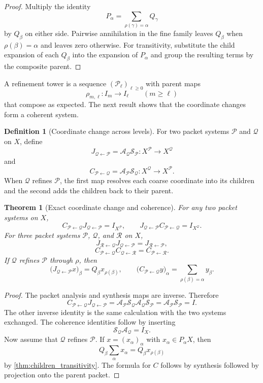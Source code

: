 \documentclass[11pt,a4paper]{article}
\newtheorem{theorem}{Theorem}[section]
\theoremstyle{definition}
\newtheorem{definition}[definition]{Definition}
\theoremstyle{remark}
\newcommand{\Acal}{\mathcal A}
\newcommand{\Pcal}{\mathcal P}
\newcommand{\Qcal}{\mathcal Q}
\newcommand{\Scal}{\mathcal S}
\newcommand{\Rcal}{\mathcal R}
\theoremstyle{definition}\newtheorem{construction}[theorem]{Construction}\newtheorem{certificate}[theorem]{Numerical Certificate}
\theoremstyle{remark}\newtheorem{boundary}[theorem]{Boundary}
\begin{document}
\begin{proof}
Multiply the identity
\[
P_\alpha=\sum_{\rho(\gamma)=\alpha}Q_\gamma
\]
by $Q_\beta$ on either side.  Pairwise annihilation in the fine family leaves $Q_\beta$ when $\rho(\beta)=\alpha$ and leaves zero otherwise.  For transitivity, substitute the child expansion of each $Q_\beta$ into the expansion of $P_\alpha$ and group the resulting terms by the composite parent.
\end{proof}

A refinement tower is a sequence $(\Pcal_\ell)_{\ell\geq0}$ with parent maps
\[
\rho_{m,\ell}:I_m\longrightarrow I_\ell
\qquad(m\geq\ell)
\]
that compose as expected.  The next result shows that the coordinate changes form a coherent system.

\begin{definition}[Coordinate change across levels]\label{def:coordinate_change}\label{def:coordinate-refinement}
For two packet systems $\Pcal$ and $\Qcal$ on $X$, define
\[
J_{\Qcal\leftarrow\Pcal}
=
\Acal_{\Qcal}\Scal_{\Pcal}:X^{\Pcal}\longrightarrow X^{\Qcal}
\]
and
\[
C_{\Pcal\leftarrow\Qcal}
=
\Acal_{\Pcal}\Scal_{\Qcal}:X^{\Qcal}\longrightarrow X^{\Pcal}.
\]
When $\Qcal$ refines $\Pcal$, the first map resolves each coarse coordinate into its children and the second adds the children back to their parent.
\end{definition}

\begin{theorem}[Exact coordinate change and coherence]\label{thm:coordinate_coherence}\label{prop:perfect-reconstruction}
For any two packet systems on $X$,
\[
C_{\Pcal\leftarrow\Qcal}J_{\Qcal\leftarrow\Pcal}=I_{X^{\Pcal}},
\qquad
J_{\Qcal\leftarrow\Pcal}C_{\Pcal\leftarrow\Qcal}=I_{X^{\Qcal}}.
\]
For three packet systems $\Pcal$, $\Qcal$, and $\Rcal$ on $X$,
\[
J_{\Rcal\leftarrow\Qcal}J_{\Qcal\leftarrow\Pcal}
=
J_{\Rcal\leftarrow\Pcal},
\]
\[
C_{\Pcal\leftarrow\Qcal}C_{\Qcal\leftarrow\Rcal}
=
C_{\Pcal\leftarrow\Rcal}.
\]
If $\Qcal$ refines $\Pcal$ through $\rho$, then
\[
\bigl(J_{\Qcal\leftarrow\Pcal}x\bigr)_\beta
=
Q_\beta x_{\rho(\beta)},
\qquad
\bigl(C_{\Pcal\leftarrow\Qcal}y\bigr)_\alpha
=
\sum_{\rho(\beta)=\alpha}y_\beta.
\]
\end{theorem}

\begin{proof}
The packet analysis and synthesis maps are inverse.  Therefore
\[
C_{\Pcal\leftarrow\Qcal}J_{\Qcal\leftarrow\Pcal}
=
\Acal_{\Pcal}\Scal_{\Qcal}\Acal_{\Qcal}\Scal_{\Pcal}
=
\Acal_{\Pcal}\Scal_{\Pcal}
=
I.
\]
The other inverse identity is the same calculation with the two systems exchanged.  The coherence identities follow by inserting
\[
\Scal_{\Qcal}\Acal_{\Qcal}=I_X.
\]
Now assume that $\Qcal$ refines $\Pcal$.  If $x=(x_\alpha)_\alpha$ with $x_\alpha\in P_\alpha X$, then
\[
Q_\beta\sum_\alpha x_\alpha
=
Q_\beta x_{\rho(\beta)}
\]
by \cref{thm:children_transitivity}.  The formula for $C$ follows by synthesis followed by projection onto the parent packet.
\end{proof}
\end{document}
